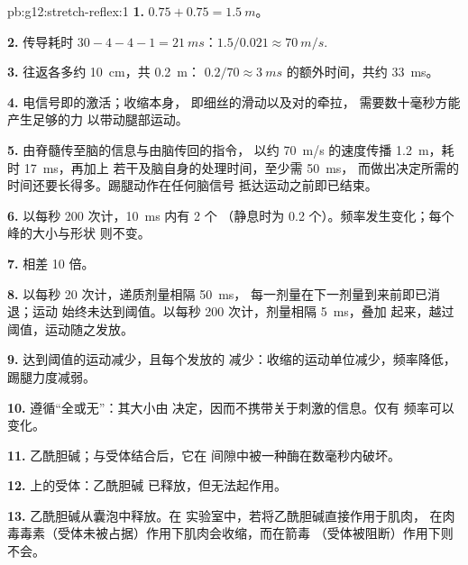 \begin{solution}{pb:g12:stretch-reflex:1}
\textbf{1.} $0.75 + 0.75 = \qty{1.5}{m}$。

\textbf{2.} 传导耗时 $30 - 4 - 4 - 1 = \qty{21}{ms}$：$1.5/0.021
\approx \qty{70}{m/s}$.

\textbf{3.} 往返各多约 \qty{10}{cm}，共 \qty{0.2}{m}：
$0.2/70 \approx \qty{3}{ms}$ 的额外时间，共约 \qty{33}{ms}。

\textbf{4.} 电信号即的激活；收缩本身，
即细丝的滑动以及对的牵拉，
需要数十毫秒方能产生足够的力
以带动腿部运动。

\textbf{5.} 由脊髓传至脑的信息与由脑传回的指令，
以约 \qty{70}{m/s} 的速度传播 \qty{1.2}{m}，耗时 \qty{17}{ms}，再加上
若干及脑自身的处理时间，至少需 \qty{50}{ms}，
而做出决定所需的时间还要长得多。踢腿动作在任何脑信号
抵达运动之前即已结束。

\textbf{6.} 以每秒 200 次计，\qty{10}{ms} 内有 2 个
（静息时为 0.2 个）。频率发生变化；每个峰的大小与形状
则不变。

\textbf{7.} 相差 10 倍。

\textbf{8.} 以每秒 20 次计，递质剂量相隔 \qty{50}{ms}，
每一剂量在下一剂量到来前即已消退；运动
始终未达到阈值。以每秒 200 次计，剂量相隔 \qty{5}{ms}，叠加
起来，越过阈值，运动随之发放。

\textbf{9.} 达到阈值的运动减少，且每个发放的
减少：收缩的运动单位减少，频率降低，
踢腿力度减弱。

\textbf{10.} 遵循“全或无”：其大小由
决定，因而不携带关于刺激的信息。仅有
频率可以变化。

\textbf{11.} 乙酰胆碱；与受体结合后，它在
间隙中被一种酶在数毫秒内破坏。

\textbf{12.} 上的受体：乙酰胆碱
已释放，但无法起作用。

\textbf{13.} 乙酰胆碱从囊泡中释放。在
实验室中，若将乙酰胆碱直接作用于肌肉，
在肉毒毒素（受体未被占据）作用下肌肉会收缩，而在箭毒
（受体被阻断）作用下则不会。


\end{solution}
